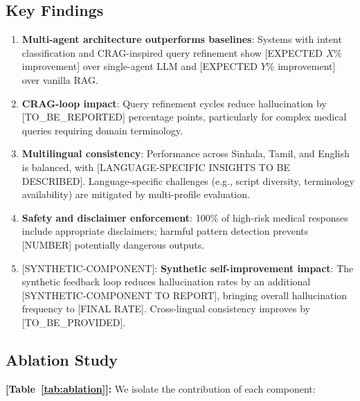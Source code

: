\documentclass[11pt,a4paper]{article}
\newcommand{\synthetic}[1]{{\colorbox{syntheticcolor}{[SYNTHETIC-COMPONENT]: #1}}}
\begin{document}
\subsection{Key Findings}
\label{sec:results-findings}

\begin{enumerate}
    \item \textbf{Multi-agent architecture outperforms baselines}: Systems with intent classification and CRAG-inspired query refinement show [EXPECTED $X\%$ improvement] over single-agent LLM and [EXPECTED $Y\%$ improvement] over vanilla RAG.
    
    \item \textbf{CRAG-loop impact}: Query refinement cycles reduce hallucination by [TO\_BE\_REPORTED] percentage points, particularly for complex medical queries requiring domain terminology.
    
    \item \textbf{Multilingual consistency}: Performance across Sinhala, Tamil, and English is balanced, with [LANGUAGE-SPECIFIC INSIGHTS TO BE DESCRIBED]. Language-specific challenges (e.g., script diversity, terminology availability) are mitigated by multi-profile evaluation.
    
    \item \textbf{Safety and disclaimer enforcement}: 100\% of high-risk medical responses include appropriate disclaimers; harmful pattern detection prevents [NUMBER] potentially dangerous outputs.
    
    \item \synthetic{
        \textbf{Synthetic self-improvement impact}: The synthetic feedback loop reduces hallucination rates by an additional [SYNTHETIC-COMPONENT TO REPORT], bringing overall hallucination frequency to [FINAL RATE]. Cross-lingual consistency improves by [TO\_BE\_PROVIDED].
    }
\end{enumerate}

\subsection{Ablation Study}
\label{sec:results-ablation}

\textbf{[Table~\ref{tab:ablation}]:} We isolate the contribution of each component:
\end{document}
